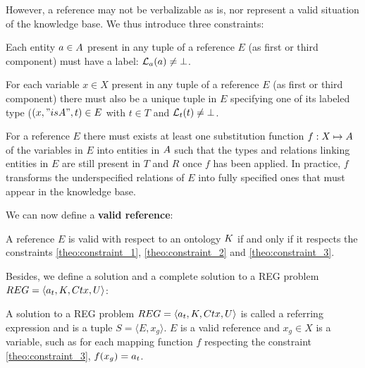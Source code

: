 \documentclass[a4paper,11pt,twoside]{StyleThese}
\begin{document}
However, a reference may not be verbalizable as is, nor  represent a valid situation of the knowledge base. We thus introduce three constraints:

\begin{constraint}
\label{theo:constraint_1}
Each entity $a \in A$ present in any tuple of a reference $E$ (as first or third component) must have a label: $\mathcal{L}_a(a) \neq \bot$.
\end{constraint}


\begin{constraint}
\label{theo:constraint_2}
For each variable $x \in X$ present in any tuple of a reference $E$ (as first or third component) there must also be a unique tuple in $E$ specifying one of its labeled type ($(x, "isA", t) \in E$ with $t \in T$ and $\mathcal{L}_t(t) \neq \bot$.
\end{constraint}


\begin{constraint}
\label{theo:constraint_3}
For a reference $E$ there must exists at least one substitution function $f: X \mapsto A$ of the variables in $E$ into entities in $A$ such that the types and relations linking entities in $E$ are still present in $T$ and $R$ once $f$ has been applied.
In practice, $f$ transforms the underspecified relations of $E$ into fully specified ones that must appear in the knowledge base.
\end{constraint}


We can now define a \textbf{valid reference}:

\begin{definition}
\label{theo:valid_ref}
A reference $E$ is valid with respect to an ontology $K$ if and only if it respects the constraints \ref{theo:constraint_1}, \ref{theo:constraint_2} and \ref{theo:constraint_3}.
\end{definition}

Besides, we define a solution and a complete solution to a REG problem $REG = \langle a_t, K, Ctx, U \rangle$:

\begin{definition}
\label{def:re}
A solution to a REG problem $REG = \langle a_t, K, Ctx, U \rangle$ is called a referring expression and is a tuple $S = \langle E, x_g \rangle$. $E$ is a valid reference and $x_g \in X$ is a variable, such as for each mapping function $f$ respecting the constraint \ref{theo:constraint_3}, $f(x_g) = a_t$.
\end{definition}
\end{document}

